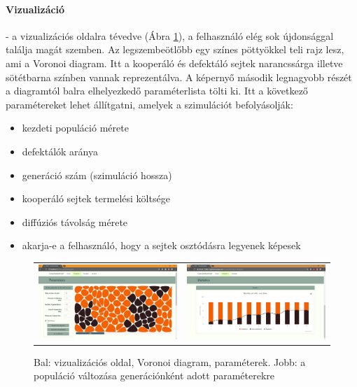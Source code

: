\paragraph{Vizualizáció}- a vizualizációs oldalra tévedve (Ábra \ref{fig:VisualizationDiagram}), a felhasználó elég sok újdonsággal találja magát szemben. Az legszembeötlőbb egy színes pöttyökkel teli rajz lesz, ami a Voronoi diagram. Itt a kooperáló és defektáló sejtek narancssárga illetve sötétbarna színben vannak reprezentálva. A képernyő második legnagyobb részét a diagramtól balra elhelyezkedő paraméterlista tölti ki. Itt a következő paramétereket lehet állítgatni, amelyek a szimulációt befolyásolják:
\begin{itemize}
	\item kezdeti populáció mérete
	\item defektálók aránya 
	\item generáció szám (szimuláció hossza)
	\item kooperáló sejtek termelési költsége 
	\item diffúziós távolság mérete
	\item akarja-e a felhasználó, hogy a sejtek osztódásra legyenek képesek
\end{itemize}

\begin{figure}[ht!]
	\centering
	\captionsetup{justification=centering}
	\begin{tabular}{cc}
		\includegraphics[width=0.47\linewidth]{images/EGTIB}
		&
		\includegraphics[width=0.47\linewidth]{images/VisualizationDiagram}
	\end{tabular}
	\caption{Bal: vizualizációs oldal, Voronoi diagram, paraméterek. Jobb: a populáció változása generációnként adott paraméterekre}	
	\label{fig:VisualizationDiagram}
\end{figure}

